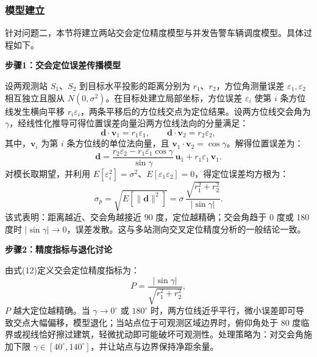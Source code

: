 
\subsubsection{模型建立}

针对问题二，本节将建立两站交会定位精度模型与并发告警车辆调度模型。具体过程如下。

\textbf{步骤1：交会定位误差传播模型}

设两观测站 $S_1$、$S_2$ 到目标水平投影的距离分别为 $r_1$、$r_2$，方位角测量误差 $\varepsilon_1,\varepsilon_2$ 相互独立且服从 $N(0,\sigma^2)$。在目标处建立局部坐标，方位误差 $\varepsilon_i$ 使第 $i$ 条方位线发生横向平移 $r_i\varepsilon_i$，两条平移后的方位线交点为定位结果。设两方位线交会角为 $\gamma$，经线性化推导可得位置误差向量沿两方位线法向的分量满足：
\begin{equation}
    \bm{d}\cdot \bm{v}_1 = r_1\varepsilon_1, \qquad \bm{d}\cdot \bm{v}_2 = r_2\varepsilon_2,
\end{equation}
其中，$\bm{v}_i$ 为第 $i$ 条方位线的单位法向量，且 $\bm{v}_1\cdot\bm{v}_2=\cos\gamma$。解得位置误差为：
\begin{equation}
    \bm{d}=\frac{r_2\varepsilon_2-r_1\varepsilon_1\cos\gamma}{\sin\gamma}\,\bm{u}_1 + r_1\varepsilon_1\,\bm{v}_1 .
\end{equation}
对模长取期望，并利用 $E[\varepsilon_i^2]=\sigma^2$、$E[\varepsilon_1\varepsilon_2]=0$，得定位误差均方根为：
\begin{equation}
    \sigma_p=\sqrt{E[\lVert\bm{d}\rVert^2]}=\sigma\,\frac{\sqrt{r_1^2+r_2^2}}{\lvert\sin\gamma\rvert} .
\end{equation}
该式表明：距离越近、交会角越接近 90 度，定位越精确；交会角趋于 0 度或 180 度时 $\lvert\sin\gamma\rvert\to 0$，误差发散。这与多站测向交叉定位精度分析的一般结论一致\cite{jiang2011shuxue,wang2007cexiang,liu2008cexiang}。

\textbf{步骤2：精度指标与退化讨论}

由式(12)定义交会定位精度指标为：
\begin{equation}
    P=\frac{\lvert\sin\gamma\rvert}{\sqrt{r_1^2+r_2^2}},
\end{equation}
$P$ 越大定位越精确。当 $\gamma\to 0^\circ$ 或 $180^\circ$ 时，两方位线近乎平行，微小误差即可导致交点大幅偏移，模型退化；当站点位于可观测区域边界时，俯仰角处于 80 度临界或视线恰好擦过建筑，轻微扰动即可能破坏可观测性。处理策略为：对交会角施加下限 $\gamma\in[40^\circ,140^\circ]$，并让站点与边界保持净距余量。

